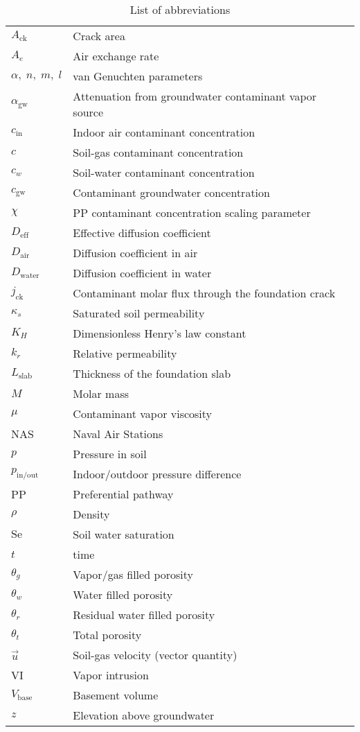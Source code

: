 \documentclass[preprint,12pt]{elsarticle}
\begin{document}
\clearpage
\begin{table}[htb!]
  \caption{List of abbreviations}\label{tbl:abbreviations}
\begin{tabular}{l l}
  \toprule
  $A_\mathrm{ck}$ & Crack area \\
  $A_e$ & Air exchange rate \\
  $\alpha, \; n, \; m, \; l$ & van Genuchten parameters \\
  $\alpha_\mathrm{gw}$ & Attenuation from groundwater contaminant vapor source \\
  $c_\mathrm{in}$ & Indoor air contaminant concentration \\
  $c$ & Soil-gas contaminant concentration \\
  $c_w$ & Soil-water contaminant concentration \\
  $c_\mathrm{gw}$ & Contaminant groundwater concentration \\
  $\chi$ & PP contaminant concentration scaling parameter \\
  $D_\mathrm{eff}$ & Effective diffusion coefficient \\
  $D_\mathrm{air}$ & Diffusion coefficient in air \\
  $D_\mathrm{water}$ & Diffusion coefficient in water \\
  $j_\mathrm{ck}$ & Contaminant molar flux through the foundation crack \\
  $\kappa_s$ & Saturated soil permeability \\
  $K_H$ & Dimensionless Henry's law constant \\
  $k_r$ & Relative permeability \\
  $L_\mathrm{slab}$ & Thickness of the foundation slab \\
  $M$ & Molar mass \\
  $\mu$ & Contaminant vapor viscosity \\
  NAS & Naval Air Stations \\
  $p$ & Pressure in soil \\
  $p_\mathrm{in/out}$ & Indoor/outdoor pressure difference \\
  PP & Preferential pathway \\
  $\rho$ & Density \\
  $\mathrm{Se}$ & Soil water saturation \\
  $t$ & time \\
  $\theta_g$ & Vapor/gas filled porosity \\
  $\theta_w$ & Water filled porosity \\
  $\theta_r$ & Residual water filled porosity \\
  $\theta_t$ & Total porosity \\
  $\vec{u}$ & Soil-gas velocity (vector quantity) \\
  VI & Vapor intrusion \\
  $V_\mathrm{base}$ & Basement volume \\
  $z$ & Elevation above groundwater \\
  \bottomrule
\end{tabular}
\end{table}




\end{document}
